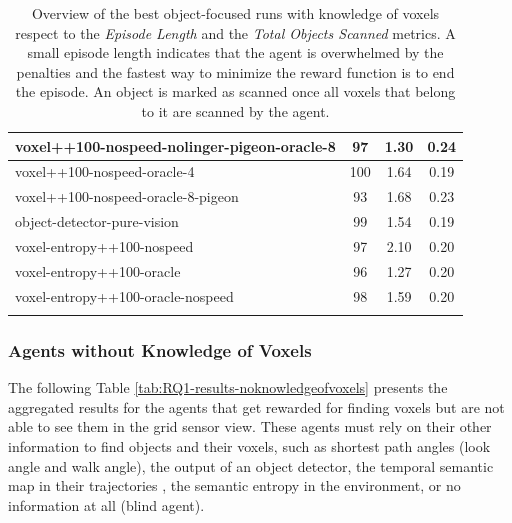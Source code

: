 \begin{longtable}{|l|c|c|c|}
voxel++100-nospeed-nolinger-pigeon-oracle-8 & 97 & {\cellcolor[HTML]{E6F0EE}} \color[HTML]{000000} 1.30 &                        0.24 \\ \hline
voxel++100-nospeed-oracle-4 & 100 & {\cellcolor[HTML]{A9D2CA}} \color[HTML]{000000} 1.64 &                       0.19 \\ \hline
voxel++100-nospeed-oracle-8-pigeon & 93 & {\cellcolor[HTML]{A1CFC5}} \color[HTML]{000000} 1.68 &                         0.23 \\ \hline
object-detector-pure-vision & 99 & {\cellcolor[HTML]{BADBD4}} \color[HTML]{000000} 1.54 &                        0.19 \\ \hline
voxel-entropy++100-nospeed & 97 & {\cellcolor[HTML]{55AA99}} \color[HTML]{000000} 2.10 &                         0.20 \\ \hline
voxel-entropy++100-oracle & 96 & {\cellcolor[HTML]{EBF2F0}} \color[HTML]{000000} 1.27 &                          0.20 \\ \hline
voxel-entropy++100-oracle-nospeed & 98 & {\cellcolor[HTML]{B1D6CE}} \color[HTML]{000000} 1.59 &                          0.20 \\ \hline




    \caption{Overview of the best object-focused runs with knowledge of voxels respect to the \textit{Episode Length} and the \textit{Total Objects Scanned} metrics. A small episode length indicates that the agent is overwhelmed by the penalties and the fastest way to minimize the reward function is to end the episode. An object is marked as scanned once all voxels that belong to it are scanned by the agent.
    } \label{tab:RQ1-results}
\end{longtable}

\subsubsection{Agents without Knowledge of Voxels}
The following Table \ref{tab:RQ1-results-noknowledgeofvoxels} presents the aggregated results for the agents that get rewarded for finding voxels but are not able to see them in the grid sensor view. These agents must rely on their other information to find objects and their voxels, such as shortest path angles (look angle and walk angle), the output of an object detector, the temporal semantic map in their trajectories \cite{chaplot2020semantic}, the semantic entropy in the environment, or no information at all (blind agent).

